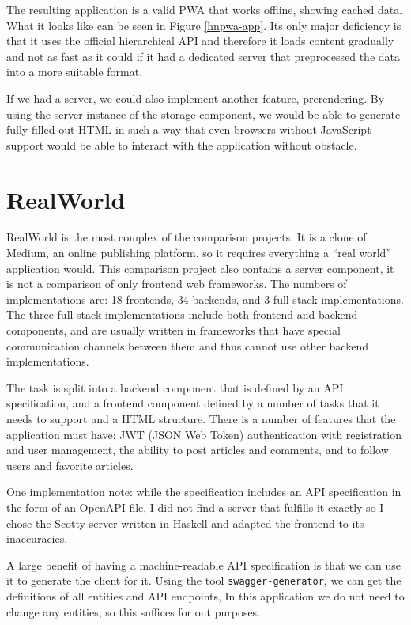 \documentclass[english,zadani,odsaz]{fitthesis}
\begin{document}
The resulting application is a valid PWA that works offline, showing cached
data. What it looks like can be seen in Figure \ref{hnpwa-app}. Its only major
deficiency is that it uses the official hierarchical API and therefore it loads
content gradually and not as fast as it could if it had a dedicated server that
preprocessed the data into a more suitable format.

If we had a server, we could also implement another feature, prerendering. By
using the server instance of the storage component, we would be able to generate
fully filled-out HTML in such a way that even browsers without JavaScript
support would be able to interact with the application without obstacle.

\section{RealWorld}
\label{sec:orgc357db4}
RealWorld \cite{realworld} is the most complex of the comparison projects. It is a
clone of Medium, an online publishing platform, so it requires everything a
``real world'' application would. This comparison project also contains a server
component, it is not a comparison of only frontend web frameworks. The numbers
of implementations are: 18 frontends, 34 backends, and 3 full-stack
implementations. The three full-stack implementations include both frontend and
backend components, and are usually written in frameworks that have special
communication channels between them and thus cannot use other backend
implementations.

The task is split into a backend component that is defined by an API
specification, and a frontend component defined by a number of tasks that it
needs to support and a HTML structure. There is a number of features that the
application must have: JWT (JSON Web Token) authentication with registration and
user management, the ability to post articles and comments, and to follow users
and favorite articles.

One implementation note: while the specification includes an API specification
in the form of an OpenAPI file, I did not find a server that fulfills it exactly
so I chose the Scotty server written in Haskell and adapted the frontend to its
inaccuracies.

A large benefit of having a machine-readable API specification is that we can
use it to generate the client for it. Using the tool \texttt{swagger-generator}, we can
get the definitions of all entities and API endpoints, In this application we do
not need to change any entities, so this suffices for out purposes.
\end{document}

